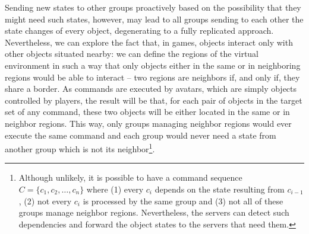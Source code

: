 \documentclass[]{usiinfprospectus}
\begin{document}
Sending new states to other groups proactively based on the possibility that they might need such states, however, may lead to all groups sending to each other the state changes of every object, degenerating to a fully replicated approach. Nevertheless, we can explore the fact that, in games, objects interact only with other objects situated nearby: we can define the regions of the virtual environment in such a way that only objects either in the same or in neighboring regions would be able to interact -- two regions are neighbors if, and only if, they share a border. As commands are executed by avatars, which are simply objects controlled by players, the result will be that, for each pair of objects in the target set of any command, these two objects will be either located in the same or in neighbor regions. This way, only groups managing neighbor regions would ever execute the same command and each group would never need a state from another group which is not its neighbor\footnote{Although unlikely, it is possible to have a command sequence $C = \{c_1,c_2,\ldots,c_n\}$ where (1) every $c_i$ depends on the state resulting from $c_{i-1}$, (2) not every $c_i$ is processed by the same group and (3) not all of these groups manage neighbor regions. Nevertheless, the servers can detect such dependencies and forward the object states to the servers that need them.%
}.

% 

\end{document}
